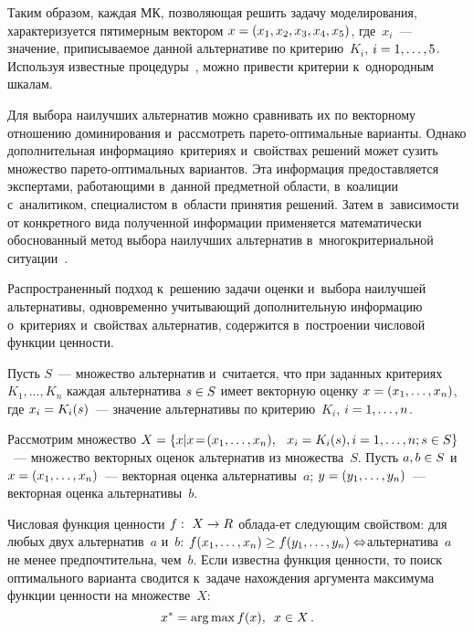 \begin{multicols}{2}
   Таким образом, каждая МК, позволяющая решить 
задачу моделирования, характеризуется пятимерным вектором $x\hm=(x_1,x_2, 
x_3, x_4,x_5)$, где~$x_i$~--- значение, приписываемое данной альтернативе по 
критерию~$K_i$, $i\hm=1,\ldots ,5$. Используя известные процедуры~\cite{7-ab}, 
можно привести критерии к~однородным шкалам.
   
   Для выбора наилучших альтернатив можно\linebreak
    сравнивать их по векторному 
отношению до\-ми\-нирования и~рассмотреть па\-ре\-то-оп\-ти\-маль\-ные варианты. 
Однако дополнительная информация\linebreak о~критериях и~свойствах решений может 
сузить множество па\-ре\-то-оп\-ти\-маль\-ных вариантов. Эта информация 
предоставляется экспертами, ра\-бо\-та\-ющи\-ми в~данной предметной области, 
в~коалиции с~аналитиком, специалистом в~области принятия решений. Затем 
в~зависимости от конкретного вида полученной информации применяется 
математически обоснованный метод выбора наилучших альтернатив 
в~многокритериальной ситуации~\cite{6-ab, 7-ab}.
   
   Распространенный подход к~решению задачи оценки и~выбора наилучшей 
альтернативы, одновременно учитывающий дополнительную информацию 
о~критериях и~свойствах альтернатив, содержится в~построении числовой 
функции ценности.
   
   Пусть $S$~--- множество альтернатив и~считается, что при заданных 
критериях $K_1, \ldots , K_n$ каждая альтернатива $s\hm\in S$ имеет векторную 
оценку $x\hm=(x_1, \ldots , x_n)$, где $x_i\hm=K_i(s)$~--- значение альтернативы 
  по критерию~$K_i$, $i\hm=1,\ldots , n$.
   
   Рассмотрим множество $X\hm= \left\{ x\vert x\!=\!(x_1, \ldots , x_n),\right.$\linebreak
   $\left. x_i\hm=K_i(s), 
i\hm=1,\ldots , n; s\hm\in S\right\}$~--- множество векторных оценок альтернатив 
из множества~$S$. Пусть $a,b\hm\in S$ и~$x\hm=(x_1,\ldots , x_n)$~--- векторная 
оценка альтернативы~$a$; $y\hm=(y_1, \ldots , y_n)$~--- векторная оценка 
альтернативы~$b$.
   
   Числовая функция ценности $f:\ X\hm\to R$ облада-\linebreak ет следующим свойством: 
для любых двух альтернатив~$a$ и~$b$: $f(x_1, \ldots , x_n)\hm\geq f(y_1, \ldots 
,y_n)\Leftrightarrow$\linebreak альтернатива~$a$ не менее предпочтительна, чем~$b$. Если 
известна функция ценности, то поиск оптимального варианта сводится к~задаче 
нахождения аргумента максимума функции ценности на множестве~$X$:
   $$
   x^*=\mathop{\mathrm{arg}\,\mathrm{max}} f(x), \enskip x\in X\,.
   $$
   

\end{multicols}
